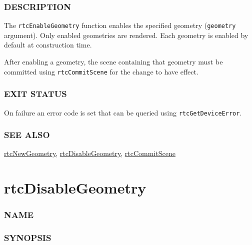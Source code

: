 \subsubsection{DESCRIPTION}\label{description}

The \texttt{rtcEnableGeometry} function enables the specified geometry
(\texttt{geometry} argument). Only enabled geometries are rendered. Each
geometry is enabled by default at construction time.

After enabling a geometry, the scene containing that geometry must be
committed using \texttt{rtcCommitScene} for the change to have effect.

\subsubsection{EXIT STATUS}\label{exit-status}

On failure an error code is set that can be queried using
\texttt{rtcGetDeviceError}.

\subsubsection{SEE ALSO}\label{see-also}

\hyperref[rtcnewgeometry]{rtcNewGeometry},
\hyperref[rtcdisablegeometry]{rtcDisableGeometry},
\hyperref[rtccommitscene]{rtcCommitScene}

\pagebreak

\section{rtcDisableGeometry}\label{rtcdisablegeometry}

\subsubsection{NAME}\label{name}

\begin{Shaded}
\begin{Highlighting}[]
\OperatorTok{{-}}
\end{Highlighting}
\end{Shaded}

\subsubsection{SYNOPSIS}\label{synopsis}

